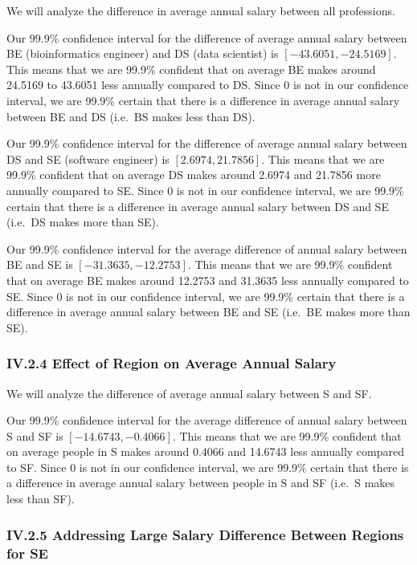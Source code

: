 \documentclass[
]{article}
\begin{document}
We will analyze the difference in average annual salary between all
professions.

Our 99.9\% confidence interval for the difference of average annual
salary between BE (bioinformatics engineer) and DS (data scientist) is
\([-43.6051, -24.5169]\). This means that we are 99.9\% confident that
on average BE makes around 24.5169 to 43.6051 less annually compared to
DS. Since 0 is not in our confidence interval, we are 99.9\% certain
that there is a difference in average annual salary between BE and DS
(i.e.~BS makes less than DS).

Our 99.9\% confidence interval for the difference of average annual
salary between DS and SE (software engineer) is \([2.6974, 21.7856]\).
This means that we are 99.9\% confident that on average DS makes around
2.6974 and 21.7856 more annually compared to SE. Since 0 is not in our
confidence interval, we are 99.9\% certain that there is a difference in
average annual salary between DS and SE (i.e.~DS makes more than SE).

Our 99.9\% confidence interval for the average difference of annual
salary between BE and SE is \([-31.3635, -12.2753]\). This means that we
are 99.9\% confident that on average BE makes around 12.2753 and 31.3635
less annually compared to SE. Since 0 is not in our confidence interval,
we are 99.9\% certain that there is a difference in average annual
salary between BE and SE (i.e.~BE makes more than SE).

\subsubsection{IV.2.4 Effect of Region on Average Annual
Salary}\label{iv.2.4-effect-of-region-on-average-annual-salary}

We will analyze the difference of average annual salary between S and
SF.

Our 99.9\% confidence interval for the average difference of annual
salary between S and SF is \([-14.6743, -0.4066]\). This means that we
are 99.9\% confident that on average people in S makes around 0.4066 and
14.6743 less annually compared to SF. Since 0 is not in our confidence
interval, we are 99.9\% certain that there is a difference in average
annual salary between people in S and SF (i.e.~S makes less than SF).

\subsubsection{IV.2.5 Addressing Large Salary Difference Between Regions
for
SE}\label{iv.2.5-addressing-large-salary-difference-between-regions-for-se}
\end{document}
